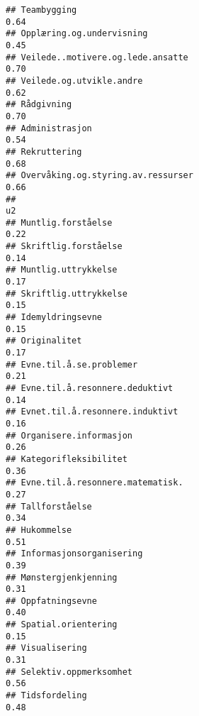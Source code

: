 \documentclass[
]{article}
\begin{document}
\begin{verbatim}
## Teambygging                                                                      0.64
## Opplæring.og.undervisning                                                        0.45
## Veilede..motivere.og.lede.ansatte                                                0.70
## Veilede.og.utvikle.andre                                                         0.62
## Rådgivning                                                                       0.70
## Administrasjon                                                                   0.54
## Rekruttering                                                                     0.68
## Overvåking.og.styring.av.ressurser                                               0.66
##                                                                                    u2
## Muntlig.forståelse                                                               0.22
## Skriftlig.forståelse                                                             0.14
## Muntlig.uttrykkelse                                                              0.17
## Skriftlig.uttrykkelse                                                            0.15
## Idemyldringsevne                                                                 0.15
## Originalitet                                                                     0.17
## Evne.til.å.se.problemer                                                          0.21
## Evne.til.å.resonnere.deduktivt                                                   0.14
## Evnet.til.å.resonnere.induktivt                                                  0.16
## Organisere.informasjon                                                           0.26
## Kategorifleksibilitet                                                            0.36
## Evne.til.å.resonnere.matematisk.                                                 0.27
## Tallforståelse                                                                   0.34
## Hukommelse                                                                       0.51
## Informasjonsorganisering                                                         0.39
## Mønstergjenkjenning                                                              0.31
## Oppfatningsevne                                                                  0.40
## Spatial.orientering                                                              0.15
## Visualisering                                                                    0.31
## Selektiv.oppmerksomhet                                                           0.56
## Tidsfordeling                                                                    0.48

\end{verbatim}
\end{document}
